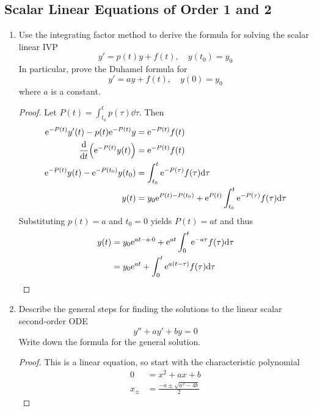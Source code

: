 \documentclass[../psets.tex]{subfiles}
\begin{document}
\subsection*{Scalar Linear Equations of Order 1 and 2}
\begin{enumerate}
    \item Use the integrating factor method to derive the formula for solving the scalar linear IVP
    \begin{equation*}
        y' = p(t)y+f(t)
        ,\quad
        y(t_0) = y_0
    \end{equation*}
    In particular, prove the Duhamel formula for
    \begin{equation*}
        y' = ay+f(t)
        ,\quad
        y(0) = y_0
    \end{equation*}
    where $a$ is a constant.
    \begin{proof}
        Let $P(t)=\int_{t_0}^tp(\tau)\dd\tau$. Then
        \begin{align*}
            \e[-P(t)]y'(t)-p(t)\e[-P(t)]y &= \e[-P(t)]f(t)\\
            \dv{t}(\e[-P(t)]y(t)) &= \e[-P(t)]f(t)\\
            \e[-P(t)]y(t)-\e[-P(t_0)]y(t_0) &= \int_{t_0}^t\e[-P(\tau)]f(\tau)\dd\tau\\
            y(t) &= y_0\e[P(t)-P(t_0)]+\e[P(t)]\int_{t_0}^t\e[-P(\tau)]f(\tau)\dd\tau
        \end{align*}
        Substituting $p(t)=a$ and $t_0=0$ yields $P(t)=at$ and thus
        \begin{align*}
            y(t) &= y_0\e[at-a\cdot 0]+\e[at]\int_0^t\e[-a\tau]f(\tau)\dd\tau\\
            &= y_0\e[at]+\int_0^t\e[a(t-\tau)]f(\tau)\dd\tau
        \end{align*}
    \end{proof}
    \item Describe the general steps for finding the solutions to the linear scalar second-order ODE
    \begin{equation*}
        y''+ay'+by = 0
    \end{equation*}
    Write down the formula for the general solution.
    \begin{proof}
        This is a linear equation, so start with the characteristic polynomial
        \begin{align*}
            0 &= x^2+ax+b\\
            x_\pm &= \frac{-a\pm\sqrt{a^2-4b}}{2}
        \end{align*}

\end{proof}
\end{enumerate}
\end{document}
